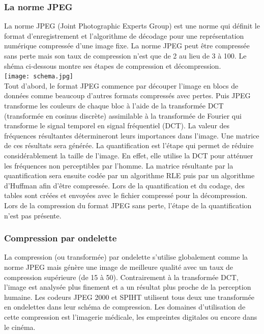 \documentclass[a4paper]{report}
\begin{document}
	\subsubsection{La norme JPEG}
		La norme JPEG (Joint Photographic Experts Group) est une norme qui définit le format d'enregistrement et l'algorithme de décodage pour une représentation numérique compressée d'une image fixe. La norme JPEG peut être compressée sans perte mais son taux de compression n'est que de 2 au lieu de 3 à 100.
Le shéma ci-dessous montre ses étapes de compression et décompression.\\
		\texttt{[image: schema.jpg]} \\
		Tout d'abord, le format JPEG commence par découper l'image en blocs de données comme beaucoup d'autres formats compressés avec pertes. Puis JPEG transforme les couleurs de chaque bloc à l'aide de la transformée DCT (transformée en cosinus discrète) assimilable à la transformée de Fourier qui transforme le signal temporel en signal fréquentiel (DCT). La valeur des fréquences résultantes détermineront leurs importances dans l'image. Une matrice de ces résultats sera générée. La quantification est l'étape qui permet de réduire considérablement la taille de l'image. En effet, elle utilise la DCT pour atténuer les fréquences non perceptibles par l'homme. La matrice résultante par la quantification sera ensuite codée par un algorithme RLE puis par un algorithme d'Huffman afin d'être compressée. Lors de la quantification et du codage, des tables sont créées et envoyées avec le fichier compressé pour la décompression.\\
	Lors de la compression du format JPEG sans perte, l'étape de la quantification n'est pas présente.

	\subsubsection{Compression par ondelette}
		La compression (ou transformée) par ondelette s'utilise globalement comme la norme JPEG mais génère une image de meilleure qualité avec un taux de compression supérieure (de 15 à 50). Contrairement à la transformée DCT, l'image est analysée plus finement et a un résultat plus proche de la perception humaine. Les codeurs JPEG 2000 et SPIHT utilisent tous deux une transformée en ondelettes dans leur schéma de compression. Les domaines d'utilisation de cette compression est l'imagerie médicale, les empreintes digitales ou encore dans le cinéma.
\end{document}
